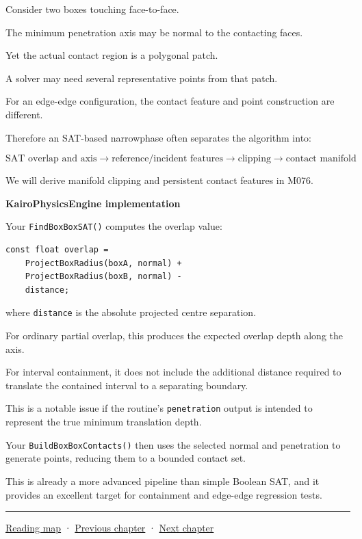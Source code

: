 Consider two boxes touching face-to-face.

The minimum penetration axis may be normal to the contacting faces.

Yet the actual contact region is a polygonal patch.

A solver may need several representative points from that patch.

For an edge-edge configuration, the contact feature and point construction are different.

Therefore an SAT-based narrowphase often separates the algorithm into:

\[
\boxed{ \text{SAT overlap and axis} \rightarrow \text{reference/incident features} \rightarrow \text{clipping} \rightarrow \text{contact manifold} }
\]

We will derive manifold clipping and persistent contact features in M076.

\textbf{KairoPhysicsEngine implementation}

Your \texttt{FindBoxBoxSAT()} computes the overlap value:

\begin{verbatim}
const float overlap =
    ProjectBoxRadius(boxA, normal) +
    ProjectBoxRadius(boxB, normal) -
    distance;
\end{verbatim}

where \texttt{distance} is the absolute projected centre separation.

For ordinary partial overlap, this produces the expected overlap depth along the axis.

For interval containment, it does not include the additional distance required to translate the contained interval to a separating boundary.

This is a notable issue if the routine's \texttt{penetration} output is intended to represent the true minimum translation depth.

Your \texttt{BuildBoxBoxContacts()} then uses the selected normal and penetration to generate points, reducing them to a bounded contact set.

This is already a more advanced pipeline than simple Boolean SAT, and it provides an excellent target for containment and edge-edge regression tests.

\begin{center}\rule{0.5\linewidth}{0.5pt}\end{center}

\hyperref[volume-reading-map]{Reading map} · \hyperref[04-visual-computing-ii-ch023-mesh-topology-and-connectivity]{Previous chapter} · \hyperref[04-visual-computing-ii-ch025-sat-for-triangle-and-convex-polygon-tests]{Next chapter}
